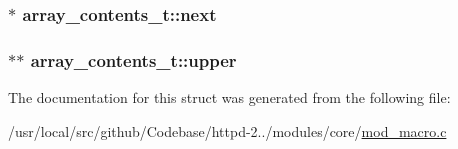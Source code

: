 \subsubsection[{\texorpdfstring{next}{next}}]{$\ast$ array\+\_\+contents\+\_\+t\+::next}\hypertarget{structarray__contents__t_a39e9035ddcd8b2dce08b0bc710af3c85}{}\label{structarray__contents__t_a39e9035ddcd8b2dce08b0bc710af3c85}
\subsubsection[{\texorpdfstring{upper}{upper}}]{$\ast$$\ast$ array\+\_\+contents\+\_\+t\+::upper}\hypertarget{structarray__contents__t_a2c981ba43498a8d017299bdc9713f0c0}{}\label{structarray__contents__t_a2c981ba43498a8d017299bdc9713f0c0}


The documentation for this struct was generated from the following file\+:\begin{DoxyCompactItemize}
\item 
/usr/local/src/github/\+Codebase/httpd-\/2../modules/core/\hyperlink{mod__macro_8c}{mod\+\_\+macro.\+c}\end{DoxyCompactItemize}
